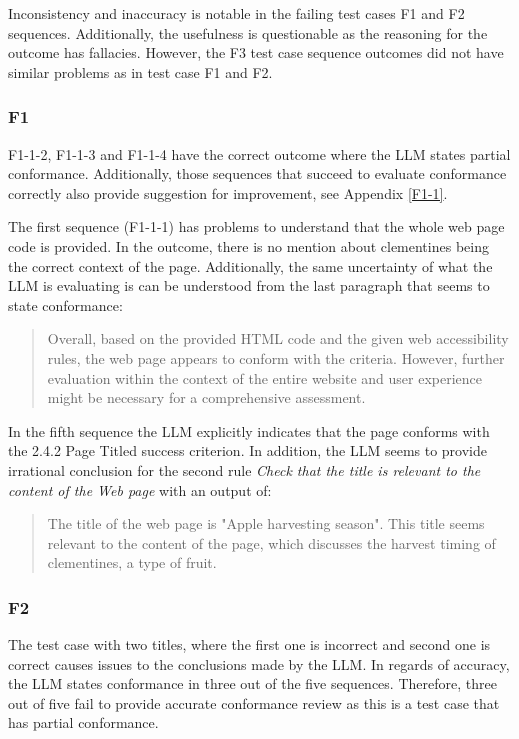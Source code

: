 Inconsistency and inaccuracy is notable in the failing test cases F1 and F2 sequences. Additionally, the usefulness is questionable as the reasoning for the outcome has fallacies. However, the F3 test case sequence outcomes did not have similar problems as in test case F1 and F2.

\subsubsection{F1}

F1-1-2, F1-1-3 and F1-1-4 have the correct outcome where the LLM states partial conformance. Additionally, those sequences that succeed to evaluate conformance correctly also provide suggestion for improvement, see Appendix \ref{F1-1}.

The first sequence (F1-1-1) has problems to understand that the whole web page code is provided. In the outcome, there is no mention about clementines being the correct context of the page. Additionally, the same uncertainty of what the LLM is evaluating is can be understood from the last paragraph that seems to state conformance:

\blockquote{Overall, based on the provided HTML code and the given web accessibility rules, the web page appears to conform with the criteria. However, further evaluation within the context of the entire website and user experience might be necessary for a comprehensive assessment.}

In the fifth sequence the LLM explicitly indicates that the page conforms with the 2.4.2 Page Titled success criterion. In addition, the LLM seems to provide irrational conclusion for the second rule \textit{Check that the title is relevant to the content of the Web page} with an output of:

\blockquote{The title of the web page is "Apple harvesting season". This title seems relevant to the content of the page, which discusses the harvest timing of clementines, a type of fruit.}


\subsubsection{F2}

The test case with two titles, where the first one is incorrect and second one is correct causes issues to the conclusions made by the LLM. In regards of accuracy, the LLM states conformance in three out of the five sequences. Therefore, three out of five fail to provide accurate conformance review as this is a test case that has partial conformance.

